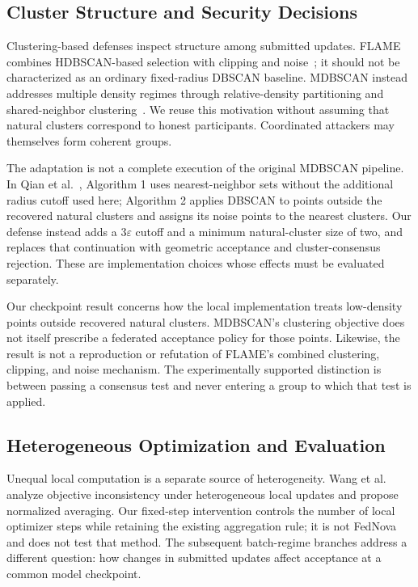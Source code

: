 \documentclass[journal]{IEEEtran}
\begin{document}
\subsection{Cluster Structure and Security Decisions}
Clustering-based defenses inspect structure among submitted updates. FLAME combines HDBSCAN-based selection with clipping and noise~\cite{nguyen2022flame}; it should not be characterized as an ordinary fixed-radius DBSCAN baseline. MDBSCAN instead addresses multiple density regimes through relative-density partitioning and shared-neighbor clustering~\cite{qian2024mdbscan}. We reuse this motivation without assuming that natural clusters correspond to honest participants. Coordinated attackers may themselves form coherent groups.

The adaptation is not a complete execution of the original MDBSCAN pipeline. In Qian et al.~\cite{qian2024mdbscan}, Algorithm 1 uses nearest-neighbor sets without the additional radius cutoff used here; Algorithm 2 applies DBSCAN to points outside the recovered natural clusters and assigns its noise points to the nearest clusters. Our defense instead adds a $3\varepsilon$ cutoff and a minimum natural-cluster size of two, and replaces that continuation with geometric acceptance and cluster-consensus rejection. These are implementation choices whose effects must be evaluated separately.

Our checkpoint result concerns how the local implementation treats low-density points outside recovered natural clusters. MDBSCAN's clustering objective does not itself prescribe a federated acceptance policy for those points. Likewise, the result is not a reproduction or refutation of FLAME's combined clustering, clipping, and noise mechanism. The experimentally supported distinction is between passing a consensus test and never entering a group to which that test is applied.

\subsection{Heterogeneous Optimization and Evaluation}
Unequal local computation is a separate source of heterogeneity. Wang et al.~\cite{wang2020fednova} analyze objective inconsistency under heterogeneous local updates and propose normalized averaging. Our fixed-step intervention controls the number of local optimizer steps while retaining the existing aggregation rule; it is not FedNova and does not test that method. The subsequent batch-regime branches address a different question: how changes in submitted updates affect acceptance at a common model checkpoint.
\end{document}
